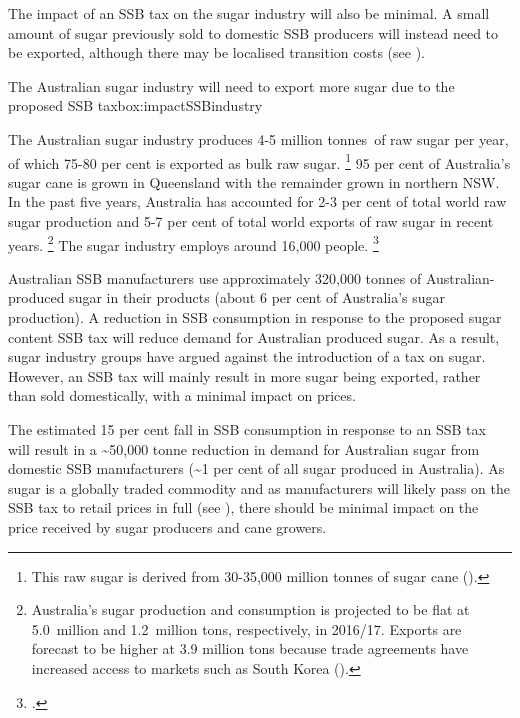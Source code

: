 \documentclass[embargoed]{grattan}
\begin{document}
The impact of an SSB tax on the sugar industry will also be minimal. A small amount of sugar previously sold to domestic SSB producers will instead need to be exported, although there may be localised transition costs (see ).

\begin{bigbox*}{The Australian sugar industry will need to export more sugar due to the proposed SSB tax}{box:impactSSBindustry}

The Australian sugar industry produces 4-5 million tonnes~of raw sugar per year, of which 75-80 per cent is exported as bulk raw sugar.%
\footnote{This raw sugar is derived from 30-35,000 million tonnes of sugar cane (\textcites{Canegrowers2015Statisticsfacts}{Agriculture2016SugarWorldMarkets}{Council2016Sugarcanestatistics}).} 95 per cent of Australia's sugar cane is grown in Queensland with the remainder grown in northern NSW.
In the past five years, Australia has accounted for 2-3 per cent of total world raw sugar production and 5-7 per cent of total world exports of raw sugar in recent years.%
\footnote{Australia's sugar production and consumption is projected to be flat at 5.0~million and 1.2~million tons, respectively, in 2016/17.
Exports are forecast to be higher at 3.9 million tons because trade agreements have increased access to markets such as South Korea (\textcite{Agriculture2016SugarWorldMarkets}).} The sugar industry employs around 16,000 people.%
\footcite{Council2016Sugarcanestatistics}

Australian SSB manufacturers use approximately 320,000 tonnes of Australian-produced sugar in their products (about 6 per cent of Australia's sugar production).
A reduction in SSB consumption in response to the proposed sugar content SSB tax will reduce demand for Australian produced sugar.
As a result, sugar industry groups have argued against the introduction of a tax on sugar.
However, an SSB tax will mainly result in more sugar being exported, rather than sold domestically, with a minimal impact on prices.

The estimated 15 per cent fall in SSB consumption in response to an SSB tax will result in a \textasciitilde{}50,000 tonne reduction in demand for Australian sugar from domestic SSB manufacturers (\textasciitilde{}1 per cent of all sugar produced in Australia).
As sugar is a globally traded commodity and as manufacturers will likely pass on the SSB tax to retail prices in full (see ), there should be minimal impact on the price received by sugar producers and cane growers.


\end{bigbox*}
\end{document}
